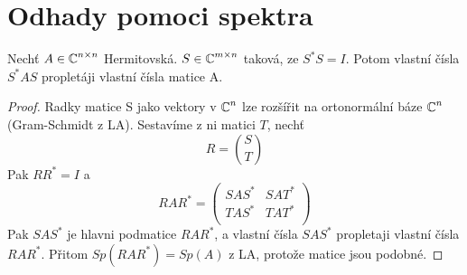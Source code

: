 \section{\texorpdfstring{Odhady pomoci spektra}{Odhady pomoci spektra}}
\vspace{5mm}
\large

\begin{theorem}[Propletani A]\label{sp_cross_a}
	Nechť $A \in \operatorname{\mathbb{C}}^{n \times n}$ Hermitovská. $S \in \operatorname{\mathbb{C}}^{m \times n}$ taková, ze $S^{\ast}S = I$.
	Potom vlastní čísla $S^{\ast}AS$ propletáji vlastní čísla matice A.
\end{theorem}
\begin{proof}
	Radky matice S jako vektory v $\operatorname{\mathbb{C}}^n$ lze rozšířit na ortonormální báze $\operatorname{\mathbb{C}}^n$ (Gram-Schmidt z LA). Sestavíme z ni matici $T$, nechť
	\[ R = \binom{S}{T} \]
	Pak $RR^{\ast} = I$ a
\[
	RAR^{\ast} =
	\begin{pmatrix}
		SAS^{\ast} & SAT^{\ast} \\
		TAS^{\ast} & TAT^{\ast} \\
	\end{pmatrix}
\]
	Pak $SAS^{\ast}$ je hlavni podmatice $RAR^{\ast}$, a vlastní čísla $SAS^{\ast}$ propletaji vlastní čísla $RAR^{\ast}$.
	Přitom $Sp(RAR^{\ast}) = Sp(A)$ z LA, protože matice jsou podobné.
\end{proof}

